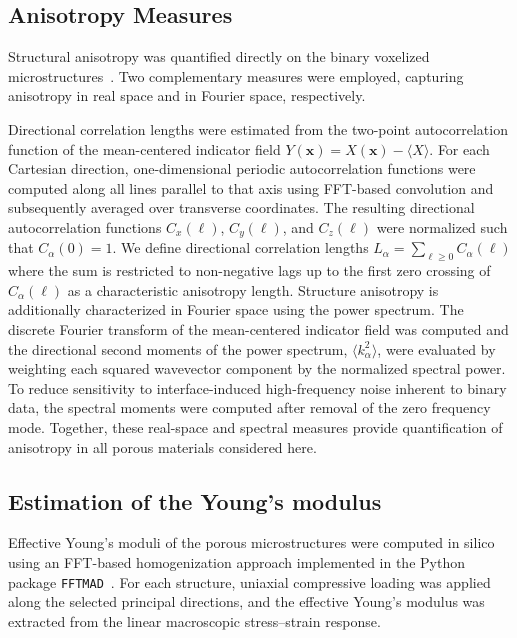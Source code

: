 \documentclass[sn-mathphys,Numbered]{sn-jnl}
\theoremstyle{definition}
\begin{document}
\subsection{Anisotropy Measures}

Structural anisotropy was quantified directly on the binary voxelized
microstructures~\cite{PhysRevE.76.031110}. Two complementary measures were employed, capturing
anisotropy in real space and in Fourier space, respectively.

Directional correlation lengths were estimated from the two-point
autocorrelation function of the mean-centered indicator field
$Y(\mathbf{x}) = X(\mathbf{x}) - \langle X \rangle$.
For each Cartesian direction, one-dimensional periodic autocorrelation functions
were computed along all lines parallel to that axis using FFT-based convolution
and subsequently averaged over transverse coordinates.
The resulting directional autocorrelation functions $C_x(\ell)$, $C_y(\ell)$,
and $C_z(\ell)$ were normalized such that $C_\alpha(0)=1$.
We define directional correlation lengths $L_\alpha = \sum_{\ell \ge 0} C_\alpha(\ell)$ 
where the sum is restricted to non-negative lags up to the first zero crossing of
$C_\alpha(\ell)$ as a characteristic anisotropy length. 
Structure anisotropy is additionally characterized in Fourier space using the power
spectrum. The discrete Fourier transform of the mean-centered indicator field was computed
and the directional second moments of the power spectrum, $\langle k_\alpha^2\rangle$, were evaluated by weighting each squared wavevector component by the normalized spectral power.
To reduce sensitivity to interface-induced high-frequency noise inherent to
binary data, the spectral moments were computed after removal of the zero
frequency mode. 
Together, these real-space and spectral measures provide quantification 
of anisotropy in all porous materials considered here. 


\subsection{Estimation of the Young's modulus}
\label{sec:fftmad}

Effective Young’s moduli of the porous microstructures were computed in silico
using an FFT-based homogenization approach implemented in the Python package
\texttt{FFTMAD}~\cite{Lucarini2019}.
For each structure, uniaxial compressive loading was applied along the selected
principal directions, and the effective Young’s modulus was extracted from the
linear macroscopic stress--strain response.
\end{document}
